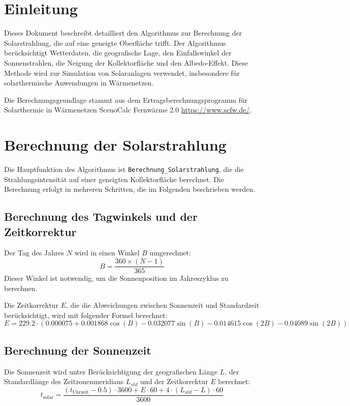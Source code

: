 \section{Einleitung}

Dieses Dokument beschreibt detailliert den Algorithmus zur Berechnung der Solarstrahlung, die auf eine geneigte Oberfläche trifft. Der Algorithmus berücksichtigt Wetterdaten, die geografische Lage, den Einfallswinkel der Sonnenstrahlen, die Neigung der Kollektorfläche und den Albedo-Effekt. Diese Methode wird zur Simulation von Solaranlagen verwendet, insbesondere für solarthermische Anwendungen in Wärmenetzen.

Die Berechnungsgrundlage stammt aus dem Ertragsberechnungsprogramm für Solarthermie in Wärmenetzen ScenoCalc Fernwärme 2.0 \url{https://www.scfw.de/}.

\section{Berechnung der Solarstrahlung}

Die Hauptfunktion des Algorithmus ist \texttt{Berechnung\_Solarstrahlung}, die die Strahlungsintensität auf einer geneigten Kollektorfläche berechnet. Die Berechnung erfolgt in mehreren Schritten, die im Folgenden beschrieben werden.

\subsection{Berechnung des Tagwinkels und der Zeitkorrektur}

Der Tag des Jahres \( N \) wird in einen Winkel \( B \) umgerechnet:
\[
B = \frac{360 \times (N - 1)}{365}
\]
Dieser Winkel ist notwendig, um die Sonnenposition im Jahreszyklus zu berechnen.

Die Zeitkorrektur \( E \), die die Abweichungen zwischen Sonnenzeit und Standardzeit berücksichtigt, wird mit folgender Formel berechnet:
\[
E = 229.2 \cdot \left( 0.000075 + 0.001868 \cos(B) - 0.032077 \sin(B) - 0.014615 \cos(2B) - 0.04089 \sin(2B) \right)
\]

\subsection{Berechnung der Sonnenzeit}

Die Sonnenzeit wird unter Berücksichtigung der geografischen Länge \( L \), der Standardlänge des Zeitzonenmeridians \( L_{std} \) und der Zeitkorrektur \( E \) berechnet:
\[
t_{\text{solar}} = \frac{(t_{\text{Uhrzeit}} - 0.5) \cdot 3600 + E \cdot 60 + 4 \cdot (L_{std} - L) \cdot 60}{3600}
\]

